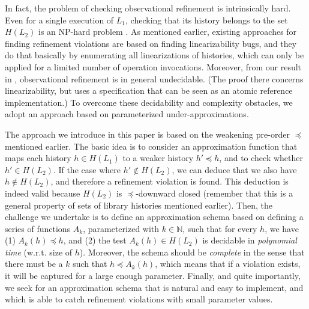 In fact, the problem of checking observational refinement is intrinsically hard. Even for a single execution of $L_1$, checking that its history belongs to the set  $H(L_2)$ is an NP-hard problem \cite{}. As mentioned earlier, existing approaches for finding refinement violations are based on finding linearizability bugs, and they do that basically by enumerating all linearizations of histories, which can only be applied for a limited number of operation invocations. Moreover, from our result in \cite{}, observational refinement is in general undecidable. (The proof there concerns linearizability, but uses a specification that can be seen as an atomic reference implementation.) To overcome these decidability and complexity obstacles, we adopt an approach based on parameterized under-approximations.

The approach we introduce in this paper is based on the weakening pre-order $\preceq$ mentioned earlier. 
The basic idea is to consider an approximation function that maps each history $h \in H(L_1)$ to a weaker history $h' \preceq h$, and to check whether  $h'  \in H(L_2)$. If the case where $h'  \not\in H(L_2)$, we can deduce that we also have $h  \not\in H(L_2)$, and therefore a refinement violation is found. This deduction is indeed valid because $H(L_2)$ is $\preceq$-downward closed (remember that this is a general property of sets of library histories mentioned earlier).
Then, the challenge we undertake is to define an approximation schema based on defining a series of functions $A_k$, parameterized with $k \in \mathbb{N}$, such that for every $h$, we have (1) $A_k (h) \preceq h$, and (2) the test $A_k(h) \in H(L_2)$ is decidable in {\em polynomial time} (w.r.t. size of $h$). Moreover, the schema should be {\em complete} in the sense that there must be a $k$ such that $h \preceq A_k(h)$, which means that if a violation exists, it will be captured for a large enough parameter. Finally, and quite importantly, we seek for an approximation schema that is natural and easy to implement, and which is able to catch refinement violations with small parameter values. 

